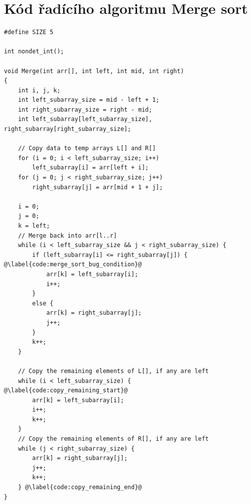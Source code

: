 \documentclass[a4paper, 11pt]{article}
\begin{document}
\pagebreak

\printbibliography[title=Zdroje]

\appendix

\section{Kód řadícího algoritmu Merge sort}\label{app:merge_sort}

\begin{listing}[H]
    \caption{Kód řadícího algoritmu Merge sort analyzovaného v sekci \ref{sec:CBMC_Demo_MergeSort}.}
    \label{lst:merge_sort}
    \begin{verbatim}
#define SIZE 5

int nondet_int();

void Merge(int arr[], int left, int mid, int right)
{
    int i, j, k;
    int left_subarray_size = mid - left + 1;
    int right_subarray_size = right - mid;
    int left_subarray[left_subarray_size], right_subarray[right_subarray_size];

    // Copy data to temp arrays L[] and R[]
    for (i = 0; i < left_subarray_size; i++)
        left_subarray[i] = arr[left + i];
    for (j = 0; j < right_subarray_size; j++)
        right_subarray[j] = arr[mid + 1 + j];

    i = 0;
    j = 0;
    k = left;
    // Merge back into arr[l..r]
    while (i < left_subarray_size && j < right_subarray_size) {
        if (left_subarray[i] <= right_subarray[j]) { @\label{code:merge_sort_bug_condition}@
            arr[k] = left_subarray[i];
            i++;
        }
        else {
            arr[k] = right_subarray[j];
            j++;
        }
        k++;
    }

    // Copy the remaining elements of L[], if any are left
    while (i < left_subarray_size) { @\label{code:copy_remaining_start}@
        arr[k] = left_subarray[i];
        i++;
        k++;
    }
    // Copy the remaining elements of R[], if any are left
    while (j < right_subarray_size) { 
        arr[k] = right_subarray[j];
        j++;
        k++;
    } @\label{code:copy_remaining_end}@
}
    \end{verbatim}
\end{listing}

\pagebreak
\end{document}
